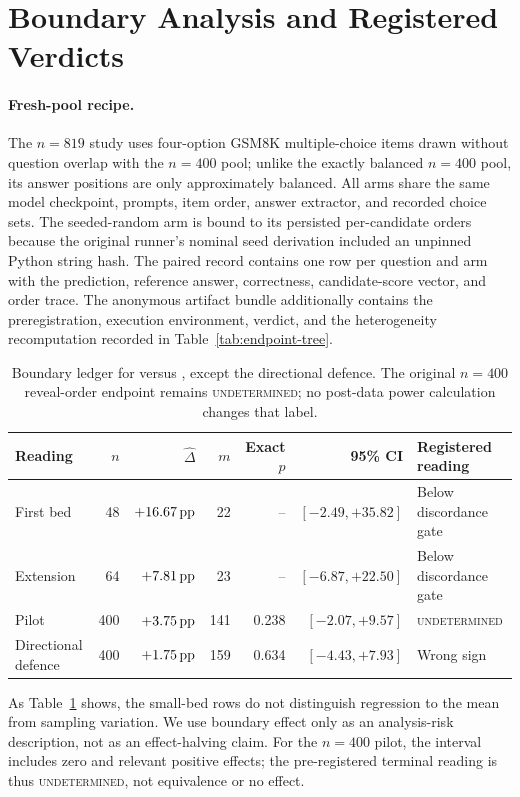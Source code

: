 \section{Boundary Analysis and Registered Verdicts}
\label{sec:boundary}

\paragraph{Fresh-pool recipe.}
The $n=819$ study uses four-option GSM8K multiple-choice items drawn without
question overlap with the $n=400$ pool; unlike the exactly balanced $n=400$
pool, its answer positions are only approximately balanced.  All arms share
the same model checkpoint, prompts, item order, answer extractor, and recorded
choice sets.  The seeded-random arm is bound to its persisted per-candidate
orders because the original runner's nominal seed derivation included an
unpinned Python string hash.  The paired record contains one row per question
and arm with the prediction, reference answer, correctness, candidate-score
vector, and order trace.  The anonymous artifact
bundle additionally contains the preregistration, execution environment,
verdict, and the heterogeneity recomputation recorded in
Table~\ref{tab:endpoint-tree}.

\begin{table}[H]
\centering
\small
\setlength{\tabcolsep}{4pt}
\caption{Boundary ledger for \sconf{} versus \rinj{}, except the directional
defence.  The original $n=400$ reveal-order endpoint remains
\textsc{undetermined}; no post-data power calculation changes that label.}
\label{tab:boundary-ledger}
\begin{tabular}{@{}lrrrrrp{}@{}}
\toprule
Reading & $n$ & $\widehat\Delta$ & $m$ & Exact $p$ & 95\% CI & Registered reading \\
\midrule
First bed & 48 & $+16.67\,\mathrm{pp}$ & 22 & -- & $[-2.49,+35.82]$ & Below discordance gate \\
Extension & 64 & $+7.81\,\mathrm{pp}$ & 23 & -- & $[-6.87,+22.50]$ & Below discordance gate \\
Pilot & 400 & $+3.75\,\mathrm{pp}$ & 141 & 0.238 & $[-2.07,+9.57]$ & \textsc{undetermined} \\
Directional defence & 400 & $+1.75\,\mathrm{pp}$ & 159 & 0.634 & $[-4.43,+7.93]$ & Wrong sign \\
\bottomrule
\end{tabular}
\end{table}

As Table~\ref{tab:boundary-ledger} shows, the small-bed rows do not distinguish
regression to the mean from sampling
variation.  We use boundary effect only as an analysis-risk description, not
as an effect-halving claim.  For the $n=400$ pilot, the interval includes zero
and relevant positive effects; the pre-registered terminal reading is thus
\textsc{undetermined}, not equivalence or no effect.

